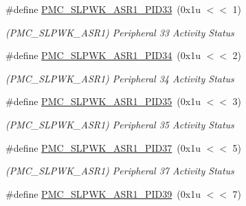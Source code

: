 \begin{DoxyCompactItemize}
\mbox{\label{group__SAMS70__PMC_gaab6384d4de4c6b740e9b296fcf8a9843}} 
\#define \mbox{\hyperlink{group__SAMS70__PMC_gaab6384d4de4c6b740e9b296fcf8a9843}{P\+M\+C\+\_\+\+S\+L\+P\+W\+K\+\_\+\+A\+S\+R1\+\_\+\+P\+I\+D33}}~(0x1u $<$$<$ 1)
\begin{DoxyCompactList}\small\item\em (P\+M\+C\+\_\+\+S\+L\+P\+W\+K\+\_\+\+A\+S\+R1) Peripheral 33 Activity Status \end{DoxyCompactList}\item 
\mbox{\label{group__SAMS70__PMC_ga90ef4c6d673fd5ed2b74616a0490df94}} 
\#define \mbox{\hyperlink{group__SAMS70__PMC_ga90ef4c6d673fd5ed2b74616a0490df94}{P\+M\+C\+\_\+\+S\+L\+P\+W\+K\+\_\+\+A\+S\+R1\+\_\+\+P\+I\+D34}}~(0x1u $<$$<$ 2)
\begin{DoxyCompactList}\small\item\em (P\+M\+C\+\_\+\+S\+L\+P\+W\+K\+\_\+\+A\+S\+R1) Peripheral 34 Activity Status \end{DoxyCompactList}\item 
\mbox{\label{group__SAMS70__PMC_ga9dc24631242c68111df9bb4e8b075060}} 
\#define \mbox{\hyperlink{group__SAMS70__PMC_ga9dc24631242c68111df9bb4e8b075060}{P\+M\+C\+\_\+\+S\+L\+P\+W\+K\+\_\+\+A\+S\+R1\+\_\+\+P\+I\+D35}}~(0x1u $<$$<$ 3)
\begin{DoxyCompactList}\small\item\em (P\+M\+C\+\_\+\+S\+L\+P\+W\+K\+\_\+\+A\+S\+R1) Peripheral 35 Activity Status \end{DoxyCompactList}\item 
\mbox{\label{group__SAMS70__PMC_gad32f9c6f78963b498f7d6c8105d86f5e}} 
\#define \mbox{\hyperlink{group__SAMS70__PMC_gad32f9c6f78963b498f7d6c8105d86f5e}{P\+M\+C\+\_\+\+S\+L\+P\+W\+K\+\_\+\+A\+S\+R1\+\_\+\+P\+I\+D37}}~(0x1u $<$$<$ 5)
\begin{DoxyCompactList}\small\item\em (P\+M\+C\+\_\+\+S\+L\+P\+W\+K\+\_\+\+A\+S\+R1) Peripheral 37 Activity Status \end{DoxyCompactList}\item 
\mbox{\label{group__SAMS70__PMC_ga17d9236f48a1f6ee42bc8287a286c525}} 
\#define \mbox{\hyperlink{group__SAMS70__PMC_ga17d9236f48a1f6ee42bc8287a286c525}{P\+M\+C\+\_\+\+S\+L\+P\+W\+K\+\_\+\+A\+S\+R1\+\_\+\+P\+I\+D39}}~(0x1u $<$$<$ 7)
$$
\end{DoxyCompactItemize}
